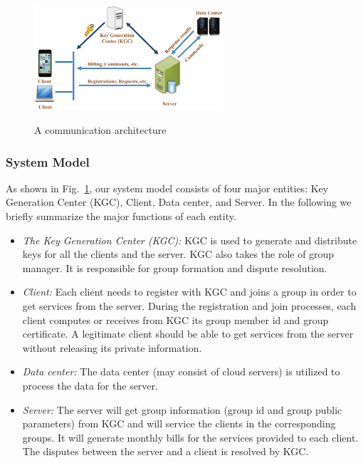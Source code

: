 \documentclass[letterpaper,12pt]{article}
\begin{document}
\begin{figure}[t] \centering
  \includegraphics[width=7cm]{systemframework}\\
  \caption{A communication architecture } \label{sec:Fig1:SystemCommunication}
\end{figure}

\subsubsection{System Model}

As shown in Fig.~\ref{sec:Fig1:SystemCommunication}, our system model consists of four major entities: Key Generation Center (KGC), Client, Data center, and Server. In the following we briefly summarize the major functions of each entity.
\begin{itemize}
\item \emph{The Key Generation Center (KGC):}  KGC is used to generate and distribute keys for all the clients and  the server. KGC also takes the role of group manager. It is responsible for group formation and dispute resolution. %

\item \emph{Client:} Each client needs to register with KGC and joins a group in order to get services from the server. During the registration and join processes, each client computes or receives from KGC its group member id and group certificate. A legitimate client should be able to get services from the server without releasing its private information. %

\item \emph{Data center:} The data center (may consist of cloud servers) is utilized to process the data for the server.

\item \emph{Server:} The server will get group information (group id and group public parameters) from KGC and will service the clients in the corresponding groups. It will generate monthly bills for the services provided to each client. The disputes between the server and a client is resolved by KGC.
\end{itemize}
\end{document}
